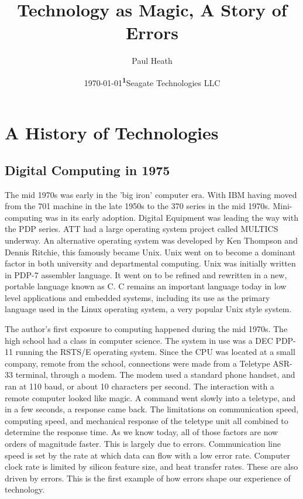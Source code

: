 \documentclass[
	a4paper, %
	10pt, %
	unnumberedsections, %
	twoside, %
]{LTJournalArticle}
\title{Technology as Magic, A Story of Errors}   %
\author{Paul Heath}
\date{\today}
\date{\footnotesize\textsuperscript{\textbf{1}}Seagate Technologies LLC }
\begin{document}
\maketitle %




\section{A History of Technologies}

\subsection{Digital Computing in 1975 }
The mid 1970s was early in the 'big iron' computer era. With IBM having moved from the 
701 machine in the late 1950s to the 370 series in the mid 1970s. Mini-computing was in its early adoption. 
Digital Equipment was leading the way with the PDP series. ATT had a large operating system project 
called MULTICS underway. An alternative operating system was developed by Ken Thompson and Dennis
Ritchie, this famously became Unix. Unix went on to become a dominant factor in both university
and departmental computing. Unix was initially written in PDP-7 assembler language. It went on to 
be refined and rewritten in a new, portable language known as C. C remains an important language today
in low level applications and embedded systems, including its use as the primary language used 
in the Linux operating system, a very popular Unix style system. 

The author's first exposure to computing happened during the mid 1970s. The high school had a class
in computer science. The system in use was a DEC PDP-11 running the RSTS/E operating system. 
Since the CPU was located at a small company, remote from the school, connections were made 
from a Teletype ASR-33 terminal, through a modem. The modem used a standard phone handset, and 
ran at 110 baud, or about 10 characters per second. The interaction with a remote computer looked 
like magic. A command went slowly into a teletype, and in a few seconds, a response came back. 
The limitations on communication speed, computing speed, and mechanical response of the teletype unit 
all combined to determine the response time. As we know today, all of those factors are now orders
of magnitude faster. This is largely due to errors. Communication line speed is set by the rate at
which data can flow with a low error rate. Computer clock rate is limited by silicon feature size, 
and heat transfer rates. These are also driven by errors. This is the first example of how errors
shape our experience of technology.
\end{document}
